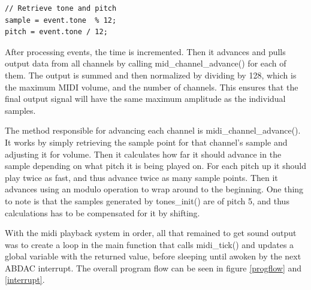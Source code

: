 \documentclass[a4paper,12pt]{article}
\begin{document}
\begin{verbatim}
// Retrieve tone and pitch
sample = event.tone  % 12;
pitch = event.tone / 12;
\end{verbatim}

After processing events, the time is incremented. Then it advances and pulls output data from all channels by calling mid\_channel\_advance() for each of them. The output is summed and then normalized by dividing by 128, which is the maximum MIDI volume, and the number of channels. This ensures that the final output signal will have the same maximum amplitude as the individual samples.

The method responsible for advancing each channel is midi\_channel\_advance(). It works by simply retrieving the sample point for that channel’s sample and adjusting it for volume. Then it calculates how far it should advance in the sample depending on what pitch it is being played on. For each pitch up it should play twice as fast, and thus advance twice as many sample points. Then it advances using an modulo operation to wrap around to the beginning. One thing to note is that the samples generated by tones\_init() are of pitch 5, and thus calculations has to be compensated for it by shifting.

With the midi playback system in order, all that remained to get sound output was to create a loop in the main function that calls midi\_tick() and updates a global variable with the returned value, before sleeping until awoken by the next ABDAC interrupt. The overall program flow can be seen in figure \ref{progflow} and \ref{interrupt}.
\end{document}
